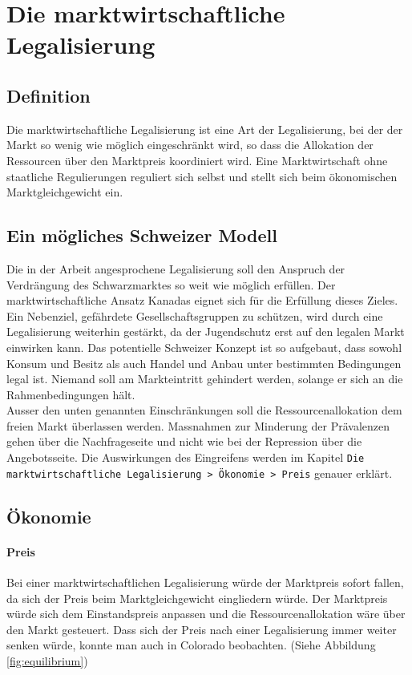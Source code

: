 \documentclass[../main.tex]{subfiles}
\begin{document}
	 \section{Die marktwirtschaftliche Legalisierung}
	 
	 \subsection{Definition}
	 Die marktwirtschaftliche Legalisierung ist eine Art der Legalisierung, bei der der Markt so wenig wie möglich eingeschränkt wird, so dass die Allokation der Ressourcen über den Marktpreis koordiniert wird.
	 Eine Marktwirtschaft ohne staatliche Regulierungen reguliert sich selbst und stellt sich beim ökonomischen Marktgleichgewicht ein.
	 
	 
	 \subsection{Ein mögliches Schweizer Modell}
	 Die in der Arbeit angesprochene Legalisierung soll den Anspruch der Verdrängung des Schwarzmarktes so weit wie möglich erfüllen.
	 Der marktwirtschaftliche Ansatz Kanadas eignet sich für die Erfüllung dieses Zieles.
	 Ein Nebenziel, gefährdete Gesellschaftsgruppen zu schützen, wird durch eine Legalisierung weiterhin gestärkt, da der Jugendschutz erst auf den legalen Markt einwirken kann.
	 Das potentielle Schweizer Konzept ist so aufgebaut, dass sowohl Konsum und Besitz als auch Handel und Anbau unter bestimmten Bedingungen legal ist.
	 Niemand soll am Markteintritt gehindert werden, solange er sich an die Rahmenbedingungen hält.\\
	 
	 \noindent
	 Ausser den unten genannten Einschränkungen soll die Ressourcenallokation dem freien Markt überlassen werden. 	 
	 Massnahmen zur Minderung der Prävalenzen gehen über die Nachfrageseite und nicht wie bei der Repression über die Angebotsseite.
	 Die Auswirkungen des Eingreifens werden im Kapitel \texttt{Die marktwirtschaftliche Legalisierung > Ökonomie > Preis} genauer erklärt.
	 
	 
	 \subsection{Ökonomie}
	 
	 \paragraph{Preis}
	 Bei einer marktwirtschaftlichen Legalisierung würde der Marktpreis sofort fallen, da sich der Preis beim Marktgleichgewicht eingliedern würde. 
	 Der Marktpreis würde sich dem Einstandspreis anpassen und die Ressourcenallokation wäre über den Markt gesteuert.
	 Dass sich der Preis nach einer Legalisierung immer weiter senken würde, konnte man auch in Colorado beobachten.
	 (Siehe Abbildung \ref{fig:equilibrium})
	 
\end{document}

